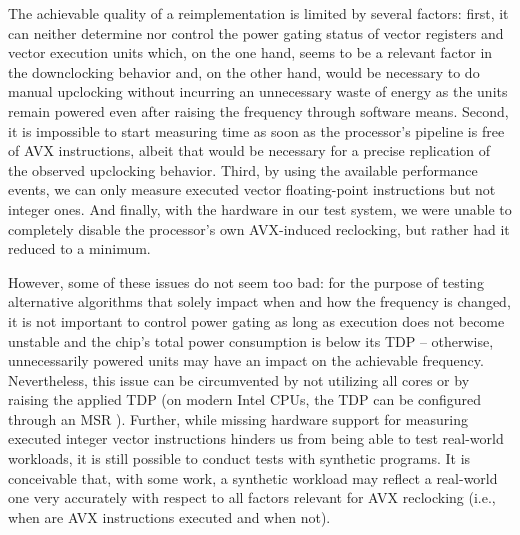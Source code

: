 The achievable quality of a reimplementation is limited by several factors: first, it can neither determine nor control the power gating status of vector registers and vector execution units which, on the one hand, seems to be a relevant factor in the downclocking behavior and, on the other hand, would be necessary to do manual upclocking without incurring an unnecessary waste of energy as the units remain powered even after raising the frequency through software means. Second, it is impossible to start measuring time as soon as the processor's pipeline is free of \gls{AVX} instructions, albeit that would be necessary for a precise replication of the observed upclocking behavior. Third, by using the available performance events, we can only measure executed vector floating-point instructions but not integer ones. And finally, with the hardware in our test system, we were unable to completely disable the processor's own \gls{AVX}-induced reclocking, but rather had it reduced to a minimum.

However, some of these issues do not seem too bad: for the purpose of testing alternative algorithms that solely impact when and how the frequency is changed, it is not important to control power gating as long as execution does not become unstable and the chip's total power consumption is below its \gls{TDP} -- otherwise, unnecessarily powered units may have an impact on the achievable frequency. Nevertheless, this issue can be circumvented by not utilizing all cores or by raising the applied \gls{TDP} (on modern Intel \glspl{CPU}, the \gls{TDP} can be configured through an \gls{MSR} \cite{intelsdmsysprogguide}). Further, while missing hardware support for measuring executed integer vector instructions hinders us from being able to test real-world workloads, it is still possible to conduct tests with synthetic programs. It is conceivable that, with some work, a synthetic workload may reflect a real-world one very accurately with respect to all factors relevant for \gls{AVX} reclocking (i.e., when are \gls{AVX} instructions executed and when not).

